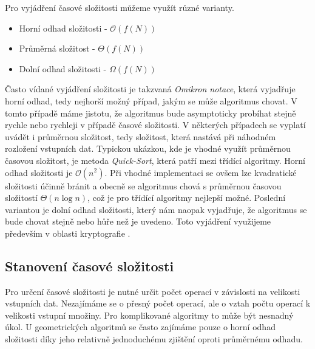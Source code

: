 Pro vyjádření časové složitosti můžeme využít různé varianty.
\begin{itemize}
	\item Horní odhad složitosti - $\mathcal{O} (f(N))$
	\item Průměrná složitost - $\Theta (f(N))$
	\item Dolní odhad složitosti - $\Omega (f(N))$
\end{itemize}	
	Často vídané vyjádření složitosti je takzvaná \textit{Omikron notace}, která vyjadřuje horní odhad, tedy nejhorší možný případ, jakým se může algoritmus chovat. V tomto případě máme jistotu, že algoritmus bude asymptoticky probíhat stejně rychle nebo rychleji v případě časové složitosti. V některých případech se vyplatí uvádět i průměrnou složitost, tedy složitost, která nastává při náhodném rozložení vstupních dat. Typickou ukázkou, kde je vhodné využít průměrnou časovou složitost, je metoda \textit{Quick-Sort}, která patří mezi třídící algoritmy. Horní odhad složitosti je $\mathcal{O}(n^2)$. Při vhodné implementaci se ovšem lze kvadratické složitosti účinně bránit a obecně se algoritmus chová s průměrnou časovou složitostí $\Theta (n \log n)$, což je pro třídící algoritmy nejlepší možné.\cite{wirth1989algoritmy} Poslední variantou je dolní odhad složitosti, který nám naopak vyjadřuje, že algoritmus se bude chovat stejně nebo hůře než je uvedeno. Toto vyjádření využijeme především v oblasti kryptografie \cite{milkova2010algoritmy,bayer2008algoritmy}.
	
\subsection{Stanovení časové složitosti}
	Pro určení časové složitosti je nutné určit počet operací v závislosti na velikosti vstupních dat. Nezajímáme se o přesný počet operací, ale o vztah počtu operací k velikosti vstupní množiny. Pro komplikované algoritmy to může být nesnadný úkol. U geometrických algoritmů se často zajímáme pouze o horní odhad složitosti díky jeho relativně jednoduchému zjištění oproti průměrnému odhadu.
	

